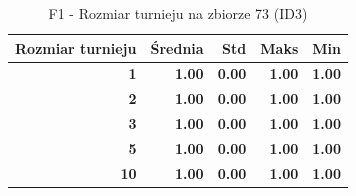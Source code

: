 \begin{table}[htbp]
\centering
\small
\setlength{\tabcolsep}{6pt}
\renewcommand{\arraystretch}{1.2}
\caption{F1 - Rozmiar turnieju na zbiorze 73 (ID3)}
\label{tab:ID3_tournament_size_73_f1}
\begin{tabular}{r|r|r|r|r}
\toprule
Rozmiar turnieju & Średnia & Std & Maks & Min \\
\hline
\textbf{1} & \textbf{1.00} & \textbf{0.00} & \textbf{1.00} & \textbf{1.00} \\
\textbf{2} & \textbf{1.00} & \textbf{0.00} & \textbf{1.00} & \textbf{1.00} \\
\textbf{3} & \textbf{1.00} & \textbf{0.00} & \textbf{1.00} & \textbf{1.00} \\
\textbf{5} & \textbf{1.00} & \textbf{0.00} & \textbf{1.00} & \textbf{1.00} \\
\textbf{10} & \textbf{1.00} & \textbf{0.00} & \textbf{1.00} & \textbf{1.00} \\
\bottomrule
\end{tabular}
\end{table}